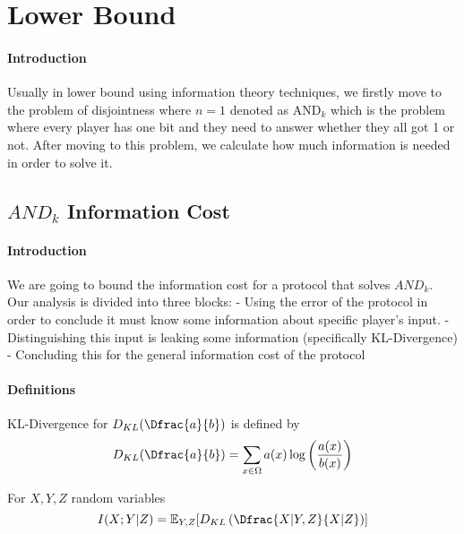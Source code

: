 \section{Lower Bound}
\paragraph{Introduction}
Usually in lower bound using information theory techniques, we firstly move to the problem of disjointness where $n=1$ denoted as $\text{AND}_k$ which is the problem where every player has one bit and they need to answer whether they all got 1 or not. After moving to this problem, we calculate how much information is needed in order to solve it.
\subsection{$AND_k$ Information Cost}
\paragraph{Introduction}
We are going to bound the information cost for a protocol that solves $AND_k$. Our analysis is divided into three blocks:  - Using the error of the protocol in order to conclude it must know some information about specific player's input.  - Distinguishing this input is leaking some information (specifically KL-Divergence)  - Concluding this for the general information cost of the protocol \newline
\paragraph{Definitions}

\begin{definition}
KL-Divergence for $D_{KL}(\Dfrac{a}{b})$ is defined by
\begin{equation*} 
    D_{KL}(\Dfrac{a}{b}) = \sum_{x \in \Omega} a(x)\log \left(\frac{a(x)}{b(x)}\right)
\end{equation*}

\begin{lemma}
    For $X, Y, Z$ random variables
    \begin{equation*}
        I(X;Y|Z) = \mathbb{E}_{Y,Z}[D_{KL}\left(\Dfrac{X|Y,Z}{X|Z}\right)]
    \end{equation*}
\end{lemma}

\end{definition}

